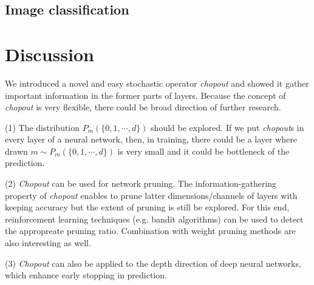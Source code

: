 \documentclass{article}
\begin{document}
    \subsection{Image classification}
    
    \section{Discussion}
    We introduced a novel and easy stochastic operator \textit{chopout} and showed it gather important information in the former parts of layers. Because the concept of \textit{chopout} is very flexible, there could be broad direction of further research.
    
    (1) The distribution $P_m(\{0, 1, \cdots, d\})$ should be explored. If we put \textit{chopout}s in every layer of a neural network, then, in training, there could be a layer where drawn $m \sim P_m(\{0, 1, \cdots, d\})$ is very small and it could be bottleneck of the prediction.

    (2) \textit{Chopout} can be used for network pruning. The information-gathering property of \textit{chopout} enables to prune latter dimensions/channels of layers with keeping accuracy but the extent of pruning is still be explored. For this end, reinforcement learning techniques (e.g. bandit algorithms) can be used to detect the appropreate pruning ratio. Combination with weight pruning methods are also interesting as well.

    (3) \textit{Chopout} can also be applied to the depth direction of deep neural networks, which enhance early stopping in prediction.
    
    
    
    
        
    
    
    
    
\end{document}
